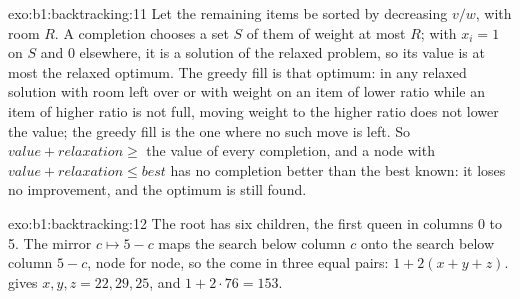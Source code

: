 \begin{solution}{exo:b1:backtracking:11}
Let the remaining items be sorted by decreasing $v/w$, with room $R$. A completion chooses a set $S$ of them of weight at
most $R$; with $x_i = 1$ on $S$ and 0 elsewhere, it is a solution of the relaxed problem, so its value is at most the
relaxed optimum. The greedy fill is that optimum: in any relaxed solution with room left over or with weight on an item
of lower ratio while an item of higher ratio is not full, moving weight to the higher ratio does not lower the value; the
greedy fill is the one where no such move is left. So $\mathit{value} + \mathit{relaxation} \geq$ the value of every
completion, and a node with $\mathit{value} + \mathit{relaxation} \leq \mathit{best}$ has no completion better than the
best known:  it loses no improvement, and the optimum is still found.
\end{solution}

\begin{solution}{exo:b1:backtracking:12}
The root has six children, the first queen in columns 0 to 5. The mirror $c \mapsto 5 - c$ maps the search below column
$c$ onto the search below column $5 - c$, node for node, so the  come in three equal pairs: $1 + 2(x + y + z)$.
 gives $x, y, z = 22, 29, 25$, and $1 + 2 \cdot 76 = 153$.
\end{solution}


